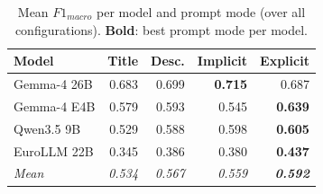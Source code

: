 \begin{table}[t]
\centering
\caption{Mean $F1_{macro}$ per model and prompt mode (over all configurations). \textbf{Bold}: best prompt mode per model.}
\label{tab:b-best-fewshot}
\small
\begin{tabular}{lrrrr}
\toprule
Model & Title & Desc. & Implicit & Explicit \\
\midrule
Gemma-4 26B & 0.683 & 0.699 & \textbf{0.715} & 0.687 \\
Gemma-4 E4B & 0.579 & 0.593 & 0.545 & \textbf{0.639} \\
Qwen3.5 9B & 0.529 & 0.588 & 0.598 & \textbf{0.605} \\
EuroLLM 22B & 0.345 & 0.386 & 0.380 & \textbf{0.437} \\
\midrule
\textit{Mean} & \textit{0.534} & \textit{0.567} & \textit{0.559} & \textit{\textbf{0.592}} \\
\bottomrule
\end{tabular}
\end{table}